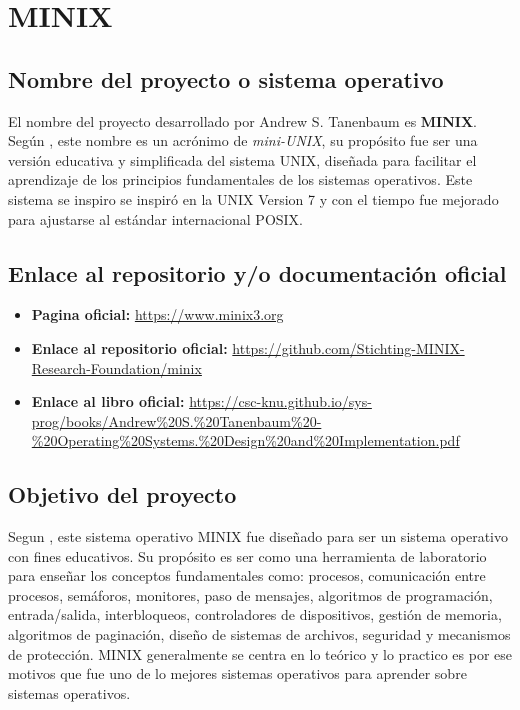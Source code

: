 \section{MINIX}

\subsection{Nombre del proyecto o sistema operativo}
El nombre del proyecto desarrollado por Andrew S. Tanenbaum es \textbf{MINIX}. Según \citep{tanenbaum2006}, este nombre es un acrónimo de \emph{mini-UNIX},
su propósito fue ser una versión educativa y simplificada del sistema UNIX, diseñada para facilitar el aprendizaje de los principios fundamentales
de los sistemas operativos. Este sistema se inspiro se inspiró en la UNIX Version 7 y con el tiempo fue mejorado para ajustarse al estándar internacional POSIX.
\subsection{Enlace al repositorio y/o documentación oficial}
\begin{itemize}
    \item \textbf{Pagina oficial:} \url{https://www.minix3.org}
    \item \textbf{Enlace al repositorio oficial:} \url{https://github.com/Stichting-MINIX-Research-Foundation/minix}
    \item \textbf{Enlace al libro oficial:} \url{https://csc-knu.github.io/sys-prog/books/Andrew%20S.%20Tanenbaum%20-%20Operating%20Systems.%20Design%20and%20Implementation.pdf}
\end{itemize}

\subsection{Objetivo del proyecto}
Segun \citep{tanenbaum2006}, este sistema operativo MINIX fue diseñado para ser un sistema operativo con fines educativos. Su propósito es ser como una herramienta de laboratorio 
para enseñar los conceptos fundamentales como: procesos, comunicación entre procesos, semáforos, monitores, paso de mensajes, algoritmos de programación, entrada/salida, interbloqueos, controladores de dispositivos, gestión de memoria, algoritmos de paginación, diseño de sistemas de archivos, seguridad y mecanismos de protección.
MINIX generalmente se centra en lo teórico y lo practico es por ese motivos que fue uno de lo mejores sistemas operativos para aprender sobre sistemas operativos.

